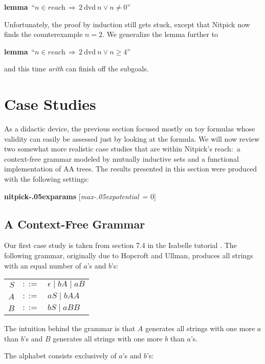 \documentclass[a4paper,12pt]{article}
\renewcommand\_{\hbox{\textunderscore\kern-.05ex}}
\begin{document}
\prew
\textbf{lemma}~``$n \in \textit{reach} \,\Longrightarrow\, 2~\textrm{dvd}~n \mathrel{\lor} n \not= 0$''
\postw

Unfortunately, the proof by induction still gets stuck, except that Nitpick now
finds the counterexample $n = 2$. We generalize the lemma further to

\prew
\textbf{lemma}~``$n \in \textit{reach} \,\Longrightarrow\, 2~\textrm{dvd}~n \mathrel{\lor} n \ge 4$''
\postw

and this time \textit{arith} can finish off the subgoals.

\section{Case Studies}
\label{case-studies}

As a didactic device, the previous section focused mostly on toy formulas whose
validity can easily be assessed just by looking at the formula. We will now
review two somewhat more realistic case studies that are within Nitpick's
reach:\ a context-free grammar modeled by mutually inductive sets and a
functional implementation of AA trees. The results presented in this
section were produced with the following settings:

\prew
\textbf{nitpick\_params} [\textit{max\_potential}~= 0]
\postw

\subsection{A Context-Free Grammar}
\label{a-context-free-grammar}

Our first case study is taken from section 7.4 in the Isabelle tutorial
\cite{isa-tutorial}. The following grammar, originally due to Hopcroft and
Ullman, produces all strings with an equal number of $a$'s and $b$'s:

\prew
\begin{tabular}{@{}r@{$\;\,$}c@{$\;\,$}l@{}}
$S$ & $::=$ & $\epsilon \mid bA \mid aB$ \\
$A$ & $::=$ & $aS \mid bAA$ \\
$B$ & $::=$ & $bS \mid aBB$
\end{tabular}
\postw

The intuition behind the grammar is that $A$ generates all strings with one more
$a$ than $b$'s and $B$ generates all strings with one more $b$ than $a$'s.

The alphabet consists exclusively of $a$'s and $b$'s:
\end{document}
